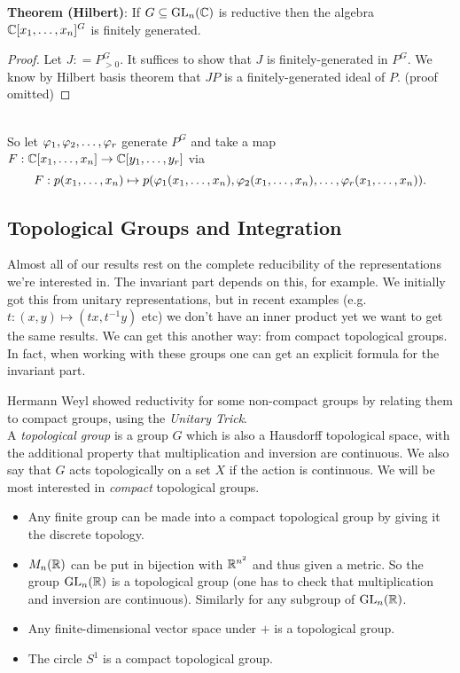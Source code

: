 \documentclass{amsart}
\begin{document}
\textbf{Theorem (Hilbert)}: If $G\subseteq \operatorname{GL}_n(\mathbb{C})$ is reductive then the algebra $\mathbb{C}[x_1,\dots,x_n]^G$ is finitely generated.
\begin{proof}
	Let $J: = P^G_{>0}$. It suffices to show that $J$ is finitely-generated in $P^G$. We know by Hilbert basis theorem that $JP$ is a finitely-generated ideal of $P$. (proof omitted)
\end{proof}\\

So let $\varphi_1,\varphi_2,\dots,\varphi_r$ generate $P^G$ and take a map $F:\mathbb{C}[x_1,\dots,x_n] \to \mathbb{C}[y_1,\dots,y_r]$ via
$$
F: p(x_1,\dots,x_n) \mapsto  p(\varphi_1(x_1,\dots,x_n),\varphi_2(x_1,\dots,x_n),\dots,\varphi_r(x_1,\dots,x_n)).
$$


\subsection{Topological Groups and Integration} Almost all of our results rest on the complete reducibility of the representations we're interested in. The invariant part depends on this, for example. We initially got this from unitary representations, but in recent examples (e.g. $t:(x,y)\mapsto (tx,t^{-1}y)$ etc) we don't have an inner product yet we want to get the same results. We can get this another way: from compact topological groups. In fact, when working with these groups one can get an explicit formula for the invariant part.

Hermann Weyl showed reductivity for some non-compact groups by relating them to compact groups, using the \textit{Unitary Trick}.\\

A \textit{topological group} is a group $G$ which is also a Hausdorff topological space, with the additional property that multiplication and inversion are continuous. We also say that $G$ acts topologically on a set $X$ if the action is continuous. We will be most interested in \textit{compact} topological groups.\\

\begin{itemize}
\item Any finite group can be made into a compact topological group by giving it the discrete topology.
\item $M_n(\mathbb{R})$ can be put in bijection with $\mathbb{R}^{n^2}$ and thus given a metric. So the group $\operatorname{GL}_n(\mathbb{R})$ is a topological group (one has to check that multiplication and inversion are continuous). Similarly for any subgroup of $\operatorname{GL}_n(\mathbb{R})$. 
\item Any finite-dimensional vector space under $+$ is a topological group.
\item The circle $S^1$ is a compact topological group. 
\end{itemize}
\end{document}

